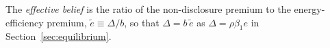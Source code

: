 \label{def:effective_belief}
The \emph{effective belief} is the ratio of the non-disclosure premium to the energy-efficiency premium, $\tilde e\equiv\Delta/b$, so that $\Delta=b\,\tilde e$ as $\Delta=\rho\beta_1 e$ in Section~\ref{sec:equilibrium}.
